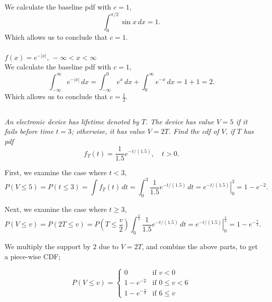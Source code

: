\documentclass[12pt]{amsart}
\begin{document}
	We calculate the baseline pdf with \(c=1\),
	\[ \int_{0}^{\pi/2}\sin x \,dx = 1. \]
	Which allows us to conclude that \(c=1\).
	
	\subsubsection{}
	\( f(x) = e^{-|x|},\, -\infty<x<\infty \) \\
	
	We calculate the baseline pdf with \(c=1\),
	\[ \int_{-\infty}^{\infty} e^{-|x|} \,dx = \int_{-\infty}^{0} e^{x} \,dx + \int_{0}^{\infty} e^{-x} \,dx = 1 + 1 = 2. \]
	Which allows us to conclude that \(c=\frac{1}{2}\).

\subsection{} %
\textit{An electronic device has lifetime denoted by $T$. The device has value $V = 5$ if it fails
	before time $t = 3$; otherwise, it has value $V = 2T$. Find the cdf of $V$, if $T$ has pdf}
	\[ f_T(t) = \frac{1}{1.5}e^{-t/(1.5)},\quad t>0.\]

	First, we examine the case where \(t<3\),
	\[ P(V\leq 5) = P(t\leq 3) = \int f_T(t) \,dt = \int_{0}^{3} \frac{1}{1.5}e^{-t/(1.5)} \,dt = \left. e^{-t/(1.5)} \right|_0^3 = 1-e^{-2} .\]
	
	Next, we examine the case where \(t\geq3\),
	\[ P(V\leq v) = P(2T\leq v) = P(T\leq\frac{v}{2}) \int_{0}^{\frac{v}{2}} \frac{1}{1.5}e^{-t/(1.5)} \,dt = \left. e^{-t/(1.5)} \right|_0^{\frac{v}{2}} = 1-e^{-\frac{v}{3}} .\]
	
	We multiply the support by $2$ due to $V = 2T$, and combine the above parts, to get a piece-wise CDF;

	\[ P(V\leq v) = \begin{cases}
		0 & \text{if } v <0 \\
		1-e^{-2} & \text{if } 0 \leq v < 6 \\
		1-e^{-\frac{v}{3}}& \text{if } 6 \leq v
	\end{cases} \]
\end{document}

